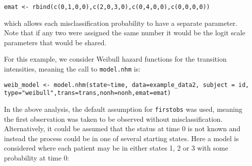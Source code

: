 \documentclass{article}
\numberwithin{equation}{section}
\begin{document}
\begin{verbatim}
emat <- rbind(c(0,1,0,0),c(2,0,3,0),c(0,4,0,0),c(0,0,0,0))
\end{verbatim}
which allows each misclassification probability to have a separate parameter. Note that if any two were assigned the same number it would be the logit scale parameters that would be shared.

For this example, we consider Weibull hazard functions for the transition intensities, meaning the call to \verb!model.nhm! is:

\begin{verbatim}
weib_model <- model.nhm(state~time, data=example_data2, subject = id,
type="weibull",trans=trans,nonh=nonh,emat=emat)
\end{verbatim}

%

In the above analysis, the default assumption for \verb!firstobs! was used, meaning the first observation was taken to be observed without misclassification. Alternatively, it could be assumed that the status at time 0 is not known and instead the process could be in one of several starting states. Here a model is considered where each patient may be in either states 1, 2 or 3 with some probability at time 0:
\end{document}
